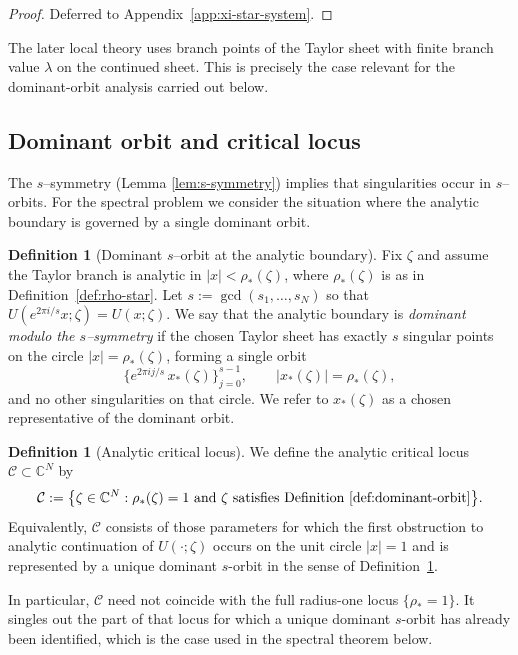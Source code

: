 \documentclass[11pt]{amsart}
\numberwithin{equation}{section}
\theoremstyle{plain}
\theoremstyle{definition}
\newtheorem{definition}[theorem]{Definition}
\theoremstyle{remark}
\newcommand{\CC}{\mathbb{C}}
\begin{document}
\begin{proof}
	Deferred to Appendix~\ref{app:xi-star-system}.
\end{proof}

The later local theory uses branch points of the Taylor sheet with finite
branch value \(\lambda\) on the continued sheet. This is precisely the case
relevant for the dominant-orbit analysis carried out below.

\subsection{Dominant orbit and critical locus}


The $s$--symmetry (Lemma \ref{lem:s-symmetry}) implies that singularities occur in $s$--orbits.  For the spectral problem we
consider the situation where the analytic boundary is governed by a single dominant orbit.

\begin{definition}[Dominant $s$--orbit at the analytic boundary]\label{def:dominant-orbit}
	Fix $\zeta$ and assume the Taylor branch is analytic in $|x|<\rho_*(\zeta)$, where $\rho_*(\zeta)$ is
	as in Definition~\ref{def:rho-star}. Let $s:=\gcd(s_1,\dots,s_N)$ so that
	$U(e^{2\pi i/s}x;\zeta)=U(x;\zeta)$. We say that the analytic boundary is \emph{dominant modulo the $s$--symmetry} if the chosen Taylor sheet has
	exactly $s$ singular points on the circle $|x|=\rho_*(\zeta)$, forming a single orbit
	\[
		\bigl\{e^{2\pi i j/s}\,x_*(\zeta)\bigr\}_{j=0}^{s-1},
		\qquad |x_*(\zeta)|=\rho_*(\zeta),
	\]
	and no other singularities on that circle. We refer to $x_*(\zeta)$ as a chosen representative of the
	dominant orbit.
\end{definition}

\begin{definition}[Analytic critical locus]
\label{def:alg-critical-locus}
We define the analytic critical locus \(\mathcal C\subset\CC^N\) by
\[
\mathcal C
:=
\bigl\{
\zeta\in\CC^N:
\rho_*(\zeta)=1
\ \text{and}\
\zeta \text{ satisfies Definition~\ref{def:dominant-orbit}}
\bigr\}.
\]
Equivalently, \(\mathcal C\) consists of those parameters for which the first
obstruction to analytic continuation of \(U(\cdot;\zeta)\) occurs on the unit
circle \(|x|=1\) and is represented by a unique dominant \(s\)-orbit in the
sense of Definition~\ref{def:dominant-orbit}.
\end{definition}

In particular, \(\mathcal C\) need not coincide with the full radius-one locus
\(\{\rho_*=1\}\). It singles out the part of that locus for which a unique
dominant \(s\)-orbit has already been identified, which is the case used in the
spectral theorem below.
\end{document}
